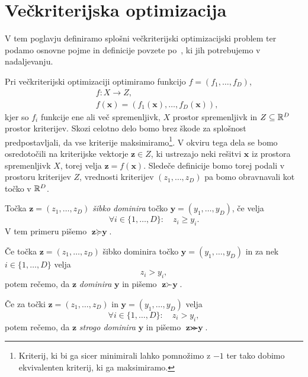 \section{Večkriterijska optimizacija}
\label{sec:definicija}
V tem poglavju definiramo splošni večkriterijski optimizacijski problem ter podamo osnovne pojme in definicije povzete po~\cite{definitions}, ki jih potrebujemo v nadaljevanju. 

Pri večkriterijski optimizaciji optimiramo funkcijo $f = (f_1, \dots, f_D)$,
\begin{align*}
    &f: X \to Z, \\
    &f(\textbf{x}) = (f_1(\textbf{x}), \dots,  f_D(\textbf{x})),
\end{align*}
kjer so $f_i$ funkcije ene ali več spremenljivk, $X$ prostor spremenljivk in $Z \subseteq \mathbb R^D$ prostor kriterijev. Skozi celotno delo bomo brez škode za splošnost predpostavljali, da vse kriterije maksimiramo\footnote{Kriterij, ki bi ga sicer minimirali lahko pomnožimo z $-1$ ter tako dobimo ekvivalenten kriterij, ki ga maksimiramo.}. 
V okviru tega dela se bomo osredotočili na kriterijske vektorje $\textbf{z} \in Z$, ki ustrezajo neki rešitvi $\textbf{x}$ iz prostora spremenljivk $X$, torej velja $\textbf{z} = f(\textbf{x})$. Sledeče definicije bomo torej podali v prostoru kriterijev $Z$, vrednosti kriterijev $(z_1, \dots, z_D)$ pa bomo obravnavali kot točko v $\mathbb R^D$.

\begin{definicija}
Točka $\textbf{z} = (z_1, \dots, z_D)$ \textit{šibko dominira} točko $\textbf{y} = (y_1, \dots, y_D)$, če velja
\[
\forall i \in \{1, \dots, D\}: \quad z_i \geq y_i.
\]
V tem primeru pišemo $\textbf{z} \succeq \textbf{y}$.
\end{definicija}

\begin{definicija}
Če točka $\textbf{z} = (z_1, \dots, z_D)$ šibko dominira točko $\textbf{y} = (y_1, \dots, y_D)$ in za nek $i \in \{1, \dots, D\}$ velja
\[
z_i > y_i,
\]
potem rečemo, da $\textbf{z}$ \textit{dominira} $\textbf{y}$ in pišemo $\textbf{z} \succ \textbf{y}$.
\end{definicija}

\begin{definicija}
Če za točki $\textbf{z} = (z_1, \dots, z_D)$ in $\textbf{y} = (y_1, \dots, y_D)$  velja
\[
\forall i \in \{1, \dots, D\}: \quad z_i > y_i,
\]
potem rečemo, da $\textbf{z}$ \textit{strogo dominira} $\textbf{y}$ in pišemo $\textbf{z} \ggcurly \textbf{y}$.
\end{definicija}


